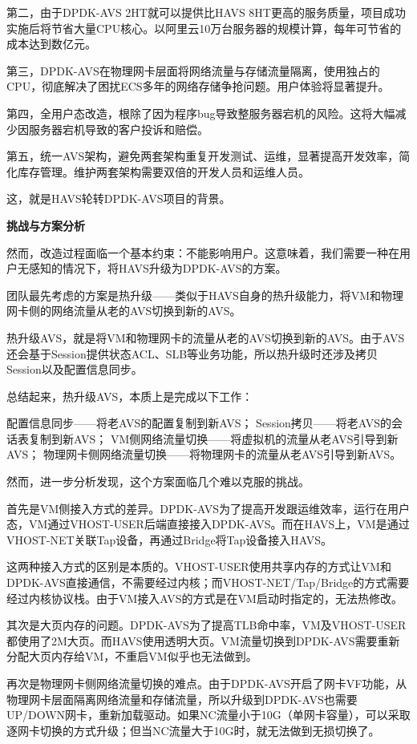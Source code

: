 第二，由于DPDK-AVS 2HT就可以提供比HAVS 8HT更高的服务质量，项目成功实施后将节省大量CPU核心。以阿里云10万台服务器的规模计算，每年可节省的成本达到数亿元。

第三，DPDK-AVS在物理网卡层面将网络流量与存储流量隔离，使用独占的CPU，彻底解决了困扰ECS多年的网络存储争抢问题。用户体验将显著提升。

第四，全用户态改造，根除了因为程序bug导致整服务器宕机的风险。这将大幅减少因服务器宕机导致的客户投诉和赔偿。

第五，统一AVS架构，避免两套架构重复开发测试、运维，显著提高开发效率，简化库存管理。维护两套架构需要双倍的开发人员和运维人员。

这，就是HAVS轮转DPDK-AVS项目的背景。

\textbf{挑战与方案分析}

然而，改造过程面临一个基本约束：不能影响用户。这意味着，我们需要一种在用户无感知的情况下，将HAVS升级为DPDK-AVS的方案。

团队最先考虑的方案是热升级——类似于HAVS自身的热升级能力，将VM和物理网卡侧的网络流量从老的AVS切换到新的AVS。

热升级AVS，就是将VM和物理网卡的流量从老的AVS切换到新的AVS。由于AVS还会基于Session提供状态ACL、SLB等业务功能，所以热升级时还涉及拷贝Session以及配置信息同步。

总结起来，热升级AVS，本质上是完成以下工作：

配置信息同步——将老AVS的配置复制到新AVS；
Session拷贝——将老AVS的会话表复制到新AVS；
VM侧网络流量切换——将虚拟机的流量从老AVS引导到新AVS；
物理网卡侧网络流量切换——将物理网卡的流量从老AVS引导到新AVS。

然而，进一步分析发现，这个方案面临几个难以克服的挑战。

首先是VM侧接入方式的差异。DPDK-AVS为了提高开发跟运维效率，运行在用户态，VM通过VHOST-USER后端直接接入DPDK-AVS。而在HAVS上，VM是通过VHOST-NET关联Tap设备，再通过Bridge将Tap设备接入HAVS。

这两种接入方式的区别是本质的。VHOST-USER使用共享内存的方式让VM和DPDK-AVS直接通信，不需要经过内核；而VHOST-NET/Tap/Bridge的方式需要经过内核协议栈。由于VM接入AVS的方式是在VM启动时指定的，无法热修改。

其次是大页内存的问题。DPDK-AVS为了提高TLB命中率，VM及VHOST-USER都使用了2M大页。而HAVS使用透明大页。VM流量切换到DPDK-AVS需要重新分配大页内存给VM，不重启VM似乎也无法做到。

再次是物理网卡侧网络流量切换的难点。由于DPDK-AVS开启了网卡VF功能，从物理网卡层面隔离网络流量和存储流量，所以升级到DPDK-AVS也需要UP/DOWN网卡，重新加载驱动。如果NC流量小于10G（单网卡容量），可以采取逐网卡切换的方式升级；但当NC流量大于10G时，就无法做到无损切换了。

